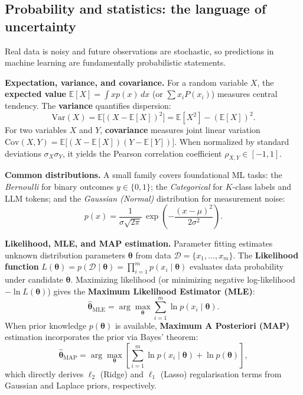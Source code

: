 \documentclass[11pt,a4paper]{article}
\begin{document}
	
	\subsection{Probability and statistics: the language of uncertainty}
	
	Real data is noisy and future observations are stochastic, so predictions in
	machine learning are fundamentally probabilistic statements.
	
	\textbf{Expectation, variance, and covariance.} For a random variable $X$, the \textbf{expected value} $\mathbb{E}[X] = \int x p(x)\,dx$ (or $\sum x_i P(x_i)$) measures central tendency. The \textbf{variance} quantifies dispersion:
	\begin{equation}
		\mathrm{Var}(X) = \mathbb{E}\bigl[(X - \mathbb{E}[X])^2\bigr] = \mathbb{E}[X^2] - (\mathbb{E}[X])^2.
	\end{equation}
	For two variables $X$ and $Y$, \textbf{covariance} measures joint linear variation $\mathrm{Cov}(X, Y) = \mathbb{E}\bigl[(X - \mathbb{E}[X])(Y - \mathbb{E}[Y])\bigr]$. When normalized by standard deviations $\sigma_X \sigma_Y$, it yields the Pearson correlation coefficient $\rho_{X,Y} \in [-1, 1]$.
	
	\textbf{Common distributions.} A small family covers foundational ML tasks: the \emph{Bernoulli} for binary outcomes $y \in \{0, 1\}$; the \emph{Categorical} for $K$-class labels and LLM tokens; and the \emph{Gaussian (Normal)} distribution for measurement noise:
	\begin{equation}
		p(x) = \frac{1}{\sigma\sqrt{2\pi}}\,
		\exp\!\left(-\frac{(x-\mu)^2}{2\sigma^2}\right).
	\end{equation}
	
	\textbf{Likelihood, MLE, and MAP estimation.} Parameter fitting estimates unknown distribution parameters $\boldsymbol{\theta}$ from data $\mathcal{D} = \{x_1, \dots, x_m\}$. The \textbf{Likelihood function} $L(\boldsymbol{\theta}) = p(\mathcal{D} \mid \boldsymbol{\theta}) = \prod_{i=1}^m p(x_i \mid \boldsymbol{\theta})$ evaluates data probability under candidate $\boldsymbol{\theta}$. Maximizing likelihood (or minimizing negative log-likelihood $-\ln L(\boldsymbol{\theta})$) gives the \textbf{Maximum Likelihood Estimator (MLE)}:
	\begin{equation}
		\hat{\boldsymbol{\theta}}_{\mathrm{MLE}} = \arg\max_{\boldsymbol{\theta}} \sum_{i=1}^{m} \ln p(x_i \mid \boldsymbol{\theta}).
	\end{equation}
	When prior knowledge $p(\boldsymbol{\theta})$ is available, \textbf{Maximum A Posteriori (MAP)} estimation incorporates the prior via Bayes' theorem:
	\begin{equation}
		\hat{\boldsymbol{\theta}}_{\mathrm{MAP}} = \arg\max_{\boldsymbol{\theta}} \left[ \sum_{i=1}^{m} \ln p(x_i \mid \boldsymbol{\theta}) + \ln p(\boldsymbol{\theta}) \right],
	\end{equation}
	which directly derives $\ell_2$ (Ridge) and $\ell_1$ (Lasso) regularisation terms from Gaussian and Laplace priors, respectively.
	
\end{document}
